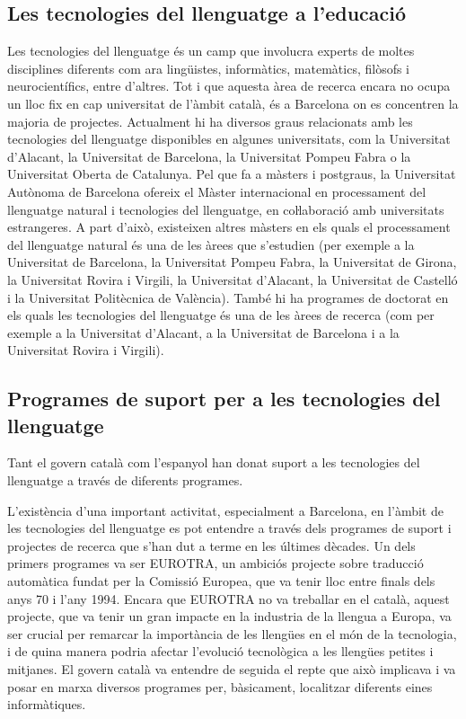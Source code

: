 \begin{multicols}{2}
\subsection{Les tecnologies del llenguatge a l’educació}

Les tecnologies del llenguatge és un camp que involucra experts de moltes disciplines diferents com ara lingüistes, informàtics, matemàtics, filòsofs i neurocientífics, entre d’altres. Tot i que aquesta àrea de recerca encara no ocupa un lloc fix en cap universitat de l’àmbit català, és a Barcelona on es concentren la majoria de projectes. 
Actualment hi ha diversos graus relacionats amb les tecnologies del llenguatge disponibles en algunes universitats, com la Universitat d’Alacant, la Universitat de Barcelona, la Universitat Pompeu Fabra o la Universitat Oberta de Catalunya.
Pel que fa a màsters i postgraus, la Universitat Autònoma de Barcelona ofereix el Màster internacional en processament del llenguatge natural i tecnologies del llenguatge, en coŀlaboració amb universitats estrangeres. A part d’això, existeixen altres màsters en els quals el processament del llenguatge natural és una de les àrees que s’estudien (per exemple a la Universitat de Barcelona, la Universitat Pompeu Fabra, la Universitat de Girona, la Universitat Rovira i Virgili, la Universitat d’Alacant, la Universitat de Castelló i la Universitat Politècnica de València). 
També hi ha programes de doctorat en els quals les tecnologies del llenguatge  és una de les àrees de recerca (com per exemple a la Universitat d’Alacant, a la Universitat de Barcelona i a la Universitat Rovira i Virgili).

\subsection{Programes de suport per a les tecnologies del llenguatge}

Tant el govern català com l’espanyol han donat suport a les tecnologies del llenguatge a través de diferents programes. 

L’existència d’una important activitat, especialment a Barcelona, en l’àmbit de les tecnologies del llenguatge es pot entendre a través dels programes de suport i projectes de recerca que s’han dut a terme en les últimes dècades. Un dels primers programes va ser EUROTRA, un ambiciós projecte sobre traducció automàtica fundat per la Comissió Europea, que va tenir lloc entre finals dels anys 70 i l’any 1994. Encara que EUROTRA no va treballar en el català, aquest projecte, que va tenir un gran impacte en la industria de la llengua a Europa, va ser crucial per remarcar la importància de les llengües en el món de la tecnologia, i de quina manera podria afectar l’evolució tecnològica a les llengües petites i mitjanes. El govern català va entendre de seguida el repte que això implicava i va posar en marxa diversos programes per, bàsicament, localitzar diferents eines informàtiques. 


\end{multicols}
